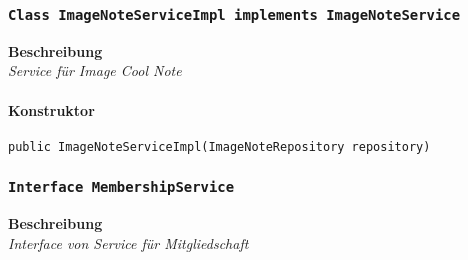     \subsubsection{\texttt{Class ImageNoteServiceImpl implements ImageNoteService}}
    \textbf{Beschreibung} \\
    \textit{Service für Image Cool Note}
    \paragraph*{Konstruktor}
    \texttt{public ImageNoteServiceImpl(ImageNoteRepository repository)}
    \subsubsection{\texttt{Interface MembershipService}}
    \textbf{Beschreibung} \\
    \textit{Interface von Service für Mitgliedschaft}
